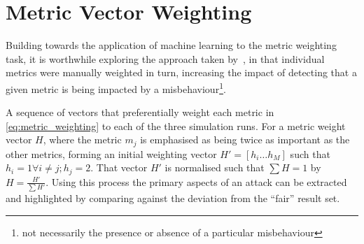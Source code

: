 \section{Metric Vector Weighting}\label{sec:metric_weighting}
%
Building towards the application of machine learning to the metric weighting task, it is worthwhile exploring the approach taken by~\cite{Guo11}, in that individual metrics were manually weighted in turn, increasing the impact of detecting that a given metric is being impacted by a misbehaviour\footnote{not necessarily the presence or absence of a particular misbehaviour}. 

A sequence of vectors that preferentially weight each metric in \autoref{eq:metric_weighting} to each of the three simulation runs.
For a metric weight vector $H$, where the metric $m_j$ is emphasised as being twice as important as the other metrics, forming an initial weighting vector $H'=[h_i\dots h_M]$ such that $h_i = 1 \forall i \ne j; h_j=2$.
That vector $H'$ is normalised such that $\sum H = 1$ by $H= \frac{H'}{\sum H'}$.
Using this process the primary aspects of an attack can be extracted and highlighted by comparing against the deviation from the ``fair'' result set. 

